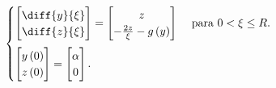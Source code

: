 \begin{frame}
    \begin{equation}
        \begin{cases}\displaystyle
            \begin{bmatrix}
                \diff{y}{\xi} \\
                \diff{z}{\xi}
            \end{bmatrix}=
            \begin{bmatrix}
                z \\
                -\frac{2z}{\xi}-
                g\left(y\right)
            \end{bmatrix}
             & \text { para }0<\xi\leq R. \\[0.5cm]\displaystyle
            \begin{bmatrix}
                y\left(0\right) \\
                z\left(0\right)
            \end{bmatrix}=
            \begin{bmatrix}
                \alpha \\
                0
            \end{bmatrix}.
             &
        \end{cases}
    \end{equation}
\end{frame}